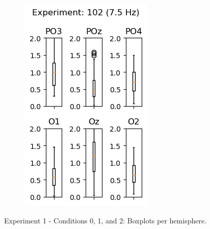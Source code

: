 \begin{figure}[h]
\begin{subfigure}{0.3\textwidth}
        \includegraphics[width=\linewidth]{images/appendix/10275.png}
        \label{fig:10275}
    \end{subfigure}
    \caption{Experiment 1 - Conditions 0, 1, and 2: Boxplots per hemisphere.}
    \label{fig:1-675}
\end{figure}


